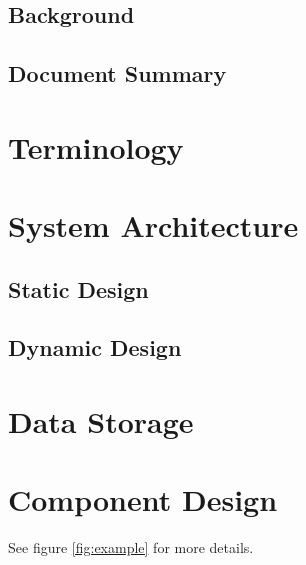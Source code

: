 \documentclass[11pt,letterpaper]{article}
\begin{document}
\subsection{Background}
\subsection{Document Summary}

\section{Terminology}

\section{System Architecture}
\subsection{Static Design}

\subsection{Dynamic Design}

\section{Data Storage}


\section{Component Design}

See figure \ref{fig:example} for more details.
\end{document}
